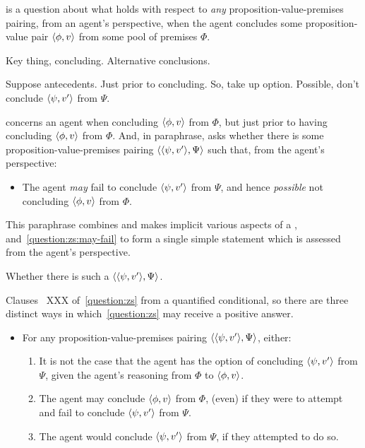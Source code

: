 \begin{note}
  \qzS{} is a question about what holds with respect to \emph{any} proposition-value-premises pairing, from an agent's perspective, when the agent concludes some proposition-value pair \(\langle \phi, v \rangle\) from some pool of premises \(\Phi\).

  Key thing, concluding.
  Alternative conclusions.

  Suppose antecedents.
  Just prior to concluding.
  So, take up option.
  Possible, don't conclude \(\langle \psi, v' \rangle\) from \(\Psi\).
\end{note}

\begin{note}
  \qzS{} concerns an agent when concluding \(\langle \phi, v \rangle\) from \(\Phi\), but just prior to having concluding \(\langle \phi, v \rangle\) from \(\Phi\).
  And, in paraphrase, asks whether there is some proposition-value-premises pairing \(\langle \langle \psi, v' \rangle, \Psi \rangle\) such that, from the agent's perspective:
  \begin{itemize}
  \item
    The agent \emph{may} fail to conclude \(\langle \psi, v' \rangle\) from \(\Psi\), and hence \emph{possible} not concluding \(\langle \phi, v \rangle\) from \(\Phi\).
  \end{itemize}

  This paraphrase combines and makes implicit various aspects of { \color{blue} a \requ{} }, and~\ref{question:zs:may-fail} to form a single simple statement which is assessed from the agent's perspective.
\end{note}

\begin{note}
  Whether there is such a \(\langle \langle \psi, v' \rangle, \Psi \rangle\).

  Clauses~{ \color{blue} XXX } of~\autoref{question:zs} from a quantified conditional, so there are three distinct ways in which~\ref{question:zs} may receive a positive answer.
  \begin{itemize}
  \item
    For any proposition-value-premises pairing \(\langle \langle \psi, v' \rangle, \Psi \rangle\), either:
    \begin{enumerate}[label=\alph*\('\).]
    \item
      It is not the case that the agent has the option of concluding \(\langle \psi, v' \rangle\) from \(\Psi\), given the agent's reasoning from \(\Phi\) to \(\langle \phi, v \rangle\).
    \item
      The agent may conclude \(\langle \phi, v \rangle\) from \(\Phi\), (even) if they were to attempt and fail to conclude \(\langle \psi, v' \rangle\) from \(\Psi\).
    \item
      The agent would conclude \(\langle \psi, v' \rangle\) from \(\Psi\), if they attempted to do so.
    \end{enumerate}
  \end{itemize}
\end{note}

